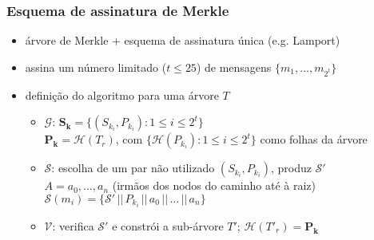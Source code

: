 \documentclass{beamer}
\newcommand{\concat}{\, \vert \vert \,}
\begin{document}
\begin{frame}
  \frametitle{Esquema de assinatura de Merkle}
  \begin{itemize}
    \item árvore de Merkle + esquema de assinatura única (e.g. Lamport)
    \item assina um número limitado ($t \leq 25$) de mensagens
      $\{m_{1}, \dots, m_{2^{t}}\}$
    \item definição do algoritmo para uma árvore $T$
      \begin{itemize}
        \item $\mathcal{G}$: $\mathbf{S_{k}}
            = \{(S_{k_{i}}, P_{k_{i}}) : 1 \leq i \leq 2^{t}\}$ \\
          \hspace{1.3em}$\mathbf{P_{k}} = \mathcal{H}(T_{r})$,
            com $\{\mathcal{H}(P_{k_{i}}) : 1 \leq i \leq 2^{t}\}$
            como folhas da árvore
        \item $\mathcal{S}$: escolha de um par não utilizado
          $(S_{k_{i}}, P_{k_{i}})$, produz $\mathcal{S}'$ \\
              \hspace{1.3em}$A = a_0, \dots, a_n$
              (irmãos dos nodos do caminho até à raiz) \\
          \hspace{1.3em}$\mathcal{S}(m_{i})
            = \{\mathcal{S}' \concat P_{k_{i}}
              \concat a_0 \concat \dots \concat a_n\}$
        \item $\mathcal{V}$: verifica $\mathcal{S}'$ e constrói a sub-árvore
          $T'$; $\mathcal{H}(T'_{r}) = \mathbf{P_{k}}$
      \end{itemize}
  \end{itemize}
\end{frame}
\end{document}
